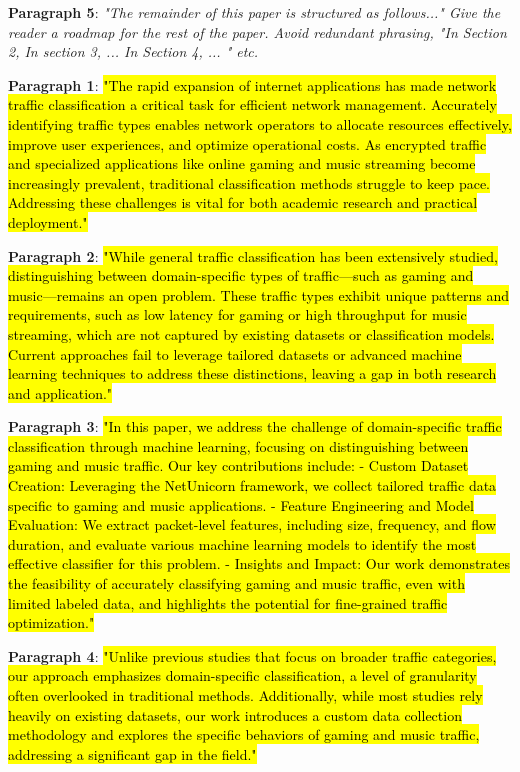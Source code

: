 \textbf{Paragraph 5}: \textit{"The remainder of this paper is structured as follows..." Give the reader a roadmap for the rest of the paper. Avoid redundant phrasing, "In Section 2, In section 3, ... In Section 4, ... " etc.}

\textbf{Paragraph 1}: \hl{"The rapid expansion of internet applications has made network traffic classification a critical task for efficient network management. Accurately identifying traffic types enables network operators to allocate resources effectively, improve user experiences, and optimize operational costs. As encrypted traffic and specialized applications like online gaming and music streaming become increasingly prevalent, traditional classification methods struggle to keep pace. Addressing these challenges is vital for both academic research and practical deployment."}

\textbf{Paragraph 2}: \hl{"While general traffic classification has been extensively studied, distinguishing between domain-specific types of traffic—such as gaming and music—remains an open problem. These traffic types exhibit unique patterns and requirements, such as low latency for gaming or high throughput for music streaming, which are not captured by existing datasets or classification models. Current approaches fail to leverage tailored datasets or advanced machine learning techniques to address these distinctions, leaving a gap in both research and application."}

\textbf{Paragraph 3}: \hl{"In this paper, we address the challenge of domain-specific traffic classification through machine learning, focusing on distinguishing between gaming and music traffic. Our key contributions include: 
- Custom Dataset Creation: Leveraging the NetUnicorn framework, we collect tailored traffic data specific to gaming and music applications.
- Feature Engineering and Model Evaluation: We extract packet-level features, including size, frequency, and flow duration, and evaluate various machine learning models to identify the most effective classifier for this problem.
- Insights and Impact: Our work demonstrates the feasibility of accurately classifying gaming and music traffic, even with limited labeled data, and highlights the potential for fine-grained traffic optimization."}

\textbf{Paragraph 4}: \hl{"Unlike previous studies that focus on broader traffic categories, our approach emphasizes domain-specific classification, a level of granularity often overlooked in traditional methods. Additionally, while most studies rely heavily on existing datasets, our work introduces a custom data collection methodology and explores the specific behaviors of gaming and music traffic, addressing a significant gap in the field."}

